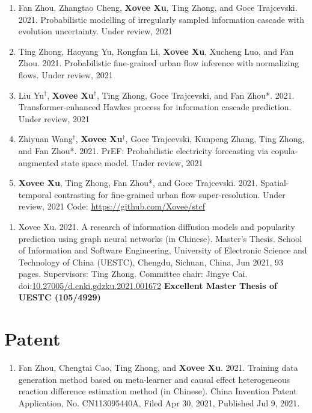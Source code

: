 \begin{enumerate}[resume]
    \item Fan Zhou, Zhangtao Cheng, \textbf{Xovee Xu}, Ting Zhong, and Goce Trajcevski. 2021. Probabilistic modelling of irregularly sampled information cascade with evolution uncertainty. Under review, 2021
    \item Ting Zhong, Haoyang Yu, Rongfan Li, \textbf{Xovee Xu}, Xucheng Luo, and Fan Zhou. 2021. Probabilistic fine-grained urban flow inference with normalizing flows. Under review, 2021
    \item Liu Yu$^\dagger$, \textbf{Xovee Xu}$^\dagger$, Ting Zhong, Goce Trajcevski, and Fan Zhou*. 2021. Transformer-enhanced Hawkes process for information cascade prediction. Under review, 2021
    \item Zhiyuan Wang$^\dagger$, \textbf{Xovee Xu}$^\dagger$, Goce Trajcevski, Kunpeng Zhang, Ting Zhong, and Fan Zhou*. 2021. PrEF: Probabilistic electricity forecasting via copula-augmented state space model. Under review, 2021 
    \item \textbf{Xovee Xu}, Ting Zhong, Fan Zhou*, and Goce Trajcevski. 2021. Spatial-temporal contrasting for fine-grained urban flow super-resolution. Under review, 2021 \newline Code: {\url{https://github.com/Xovee/stcf}}
\end{enumerate}


\begin{enumerate}
    \item Xovee Xu. 2021. A research of information diffusion models and popularity prediction using graph neural networks (in Chinese). Master's Thesis. School of Information and Software Engineering, University of Electronic Science and Technology of China (UESTC), Chengdu, Sichuan, China, Jun 2021, 93 pages. Supervisors: Ting Zhong. Committee chair: Jingye Cai. doi:\href{https://doi.org/10.27005/d.cnki.gdzku.2021.001672}{10.27005/d.cnki.gdzku.2021.001672}\newline
    \textbf{\color{red}Excellent Master Thesis of UESTC (105/4929)}
\end{enumerate}

\section*{Patent}

\begin{enumerate}
    \item Fan Zhou, Chengtai Cao, Ting Zhong, and \textbf{Xovee Xu}. 2021. Training data generation method based on meta-learner and causal effect heterogeneous reaction difference estimation method (in Chinese). China Invention Patent Application, No. CN113095440A, Filed Apr 30, 2021, Published Jul 9, 2021. 
\end{enumerate}